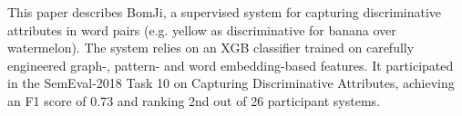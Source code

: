 This paper describes BomJi, a supervised system for capturing discriminative attributes in word pairs (e.g. yellow as discriminative for banana over watermelon). The system relies on an XGB classifier trained on carefully engineered graph-, pattern- and word embedding-based features. It participated in the SemEval-2018 Task 10 on Capturing Discriminative Attributes, achieving an F1 score of 0.73 and ranking 2nd out of 26 participant systems.

